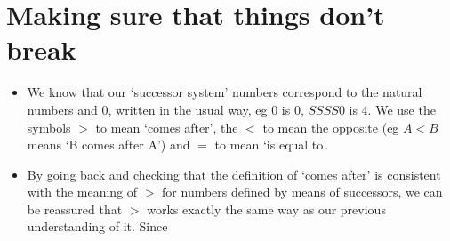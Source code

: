 \chapter{Making sure that things don't break}
\label{well-defined}
\depends{}

\begin{itemize}
\item
We know that our `successor system' numbers correspond to the natural numbers and $0$, written in the usual way, eg $0$ is $0$, $SSSS0$ is $4$. We use the symbols $>$ to mean `comes after', the $<$ to mean the opposite (eg $A<B$ means `B comes after A') and $=$ to mean `is equal to'.
\item
By going back and checking that the definition of `comes after' is consistent with the meaning of $>$ for numbers defined by means of successors, we can be reassured that $>$ works exactly the same way as our previous understanding of it. Since 
\end{itemize}
